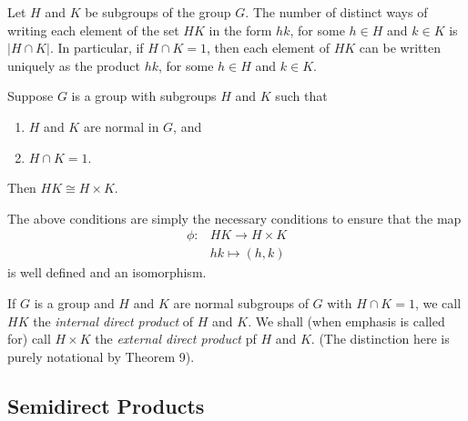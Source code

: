 \documentclass[../main]{subfiles}
\begin{document}
\begin{prop}
 Let $H$ and $K$ be subgroups of the group $G$. The number of distinct ways of writing each element of the set $HK$ in the form $hk$, for some $h \in H$ and $k \in K$ is $|H \cap K|$. In particular, if $H \cap K = 1$, then each element of $HK$ can be written uniquely as the product $hk$, for some $h \in H$ and $k \in K$. 
\end{prop}


\begin{thm}
 Suppose $G$ is a group with subgroups $H$ and $K$ such that 
 \begin{enumerate}
  \item $H$ and $K$ are normal in $G$, and 
  \item $H \cap K = 1$.
 \end{enumerate}
 Then $HK \cong H \times K$.
\end{thm}

\begin{nt}
 The above conditions are simply the necessary conditions to ensure that the map 
 \begin{align*}
  \phi \colon & HK \to H \times K \\
  & hk \mapsto (h,k)
 \end{align*}
 is well defined and an isomorphism.
\end{nt}


\begin{dfn}
 If $G$ is a group and $H$ and $K$ are normal subgroups of $G$ with $H \cap K = 1$, we call $HK$ the \textit{internal direct product} of $H$ and $K$. We shall (when emphasis is called for) call $H \times K$ the \textit{external direct product} pf $H$ and $K$. (The distinction here is purely notational by Theorem 9).
\end{dfn}


\subsection{Semidirect Products}
\end{document}
